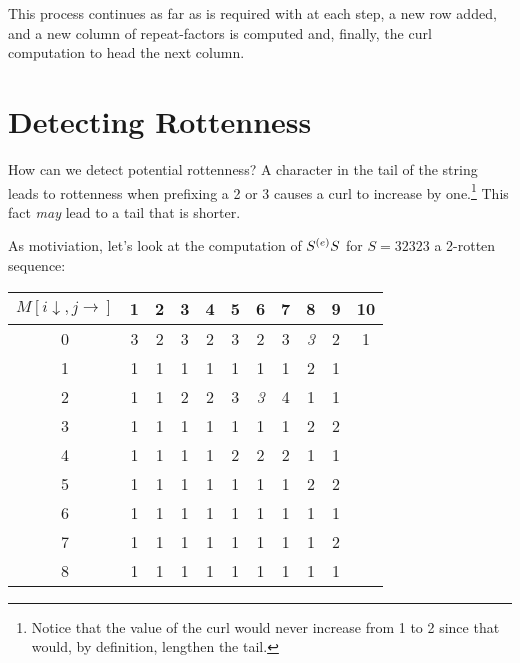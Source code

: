 \documentclass[11pt]{article}
\def\emph#1{{\em #1\/}}
\begin{document}
This process continues as far as is required with at each step, a new row added,
and a new column of repeat-factors is computed and, finally, the curl computation to head the next column.

\section{Detecting Rottenness}
How can we detect potential rottenness?  A character in the tail of the
string leads to rottenness when prefixing a 2 or 3 causes a curl to increase
by one.\footnote{Notice that the value of the curl would never increase from
1 to 2 since that would, by definition, lengthen the tail.}  This fact
\emph{may} lead to a tail that is shorter.

As motiviation, let's look at the computation of $S^{(e)}{S}$ for $S=32323$ a
2-rotten sequence:
\begin{center}
\begin{tabular}{|c||c|c|c|c|c||c|c|c|c|c|}
\hline
$M[i\downarrow,j\rightarrow]$ & 1 & 2 & 3 & 4 & 5 & 6 & 7 & 8 & 9 & 10 \\\hline\hline
0 &  3 & 2 & 3 & 2 & 3 & 2 & 3 & {\em 3} & 2 & 1 \\\hline
1 &  1 & 1 & 1 & 1 & 1 & 1 & 1 & 2 & 1 & \\ 
2 &  1 & 1 & 2 & 2 & 3 & {\em 3} & 4 & 1 & 1 & \\ 
3 &  1 & 1 & 1 & 1 & 1 & 1 & 1 & 2 & 2 & \\ 
4 &  1 & 1 & 1 & 1 & 2 & 2 & 2 & 1 & 1 & \\ 
5 &  1 & 1 & 1 & 1 & 1 & 1 & 1 & 2 & 2 & \\ 
6 &  1 & 1 & 1 & 1 & 1 & 1 & 1 & 1 & 1 & \\ 
7 &  1 & 1 & 1 & 1 & 1 & 1 & 1 & 1 & 2 & \\ 
8 &  1 & 1 & 1 & 1 & 1 & 1 & 1 & 1 & 1 & \\ \hline
\end{tabular}
\end{center}
\end{document}
